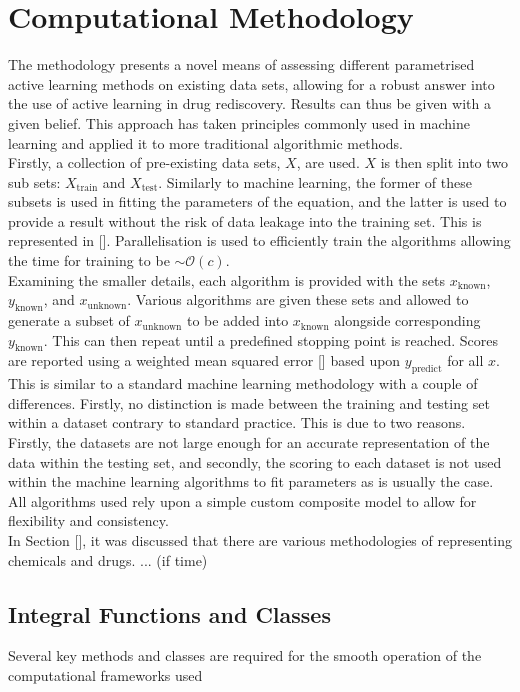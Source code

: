 \section{Computational Methodology}
The methodology presents a novel means of assessing different parametrised active learning methods on existing data sets, allowing for a robust answer into the use of active learning in drug rediscovery. Results can thus be given with a given belief. This approach has taken principles commonly used in machine learning and applied it to more traditional algorithmic methods.
\\
Firstly, a collection of pre-existing data sets, $X$, are used. $X$ is then split into two sub sets: $X_{\mathrm{train}}$ and $X_\mathrm{test}$. Similarly to machine learning, the former of these subsets is used in fitting the parameters of the equation, and the latter is used to provide a result without the risk of data leakage into the training set. This is represented in []. Parallelisation is used to efficiently train the algorithms allowing the time for training to be $\sim{}\mathcal{O}(c)$.
\\
Examining the smaller details, each algorithm is provided with the sets $x_\mathrm{known}$, $y_\mathrm{known}$, and $x_\mathrm{unknown}$. Various algorithms are given these sets and allowed to generate a subset of $x_\mathrm{unknown}$ to be added into $x_\mathrm{known}$ alongside corresponding $y_\mathrm{known}$. This can then repeat until a predefined stopping point is reached. Scores are reported using a weighted mean squared error [] based upon $y_\mathrm{predict}$ for all $x$. This is similar to a standard machine learning methodology with a couple of differences. Firstly, no distinction is made between the training and testing set within a dataset contrary to standard practice. This is due to two reasons. Firstly, the datasets are not large enough for an accurate representation of the data within the testing set, and secondly, the scoring to each dataset is not used within the machine learning algorithms to fit parameters as is usually the case. All algorithms used rely upon a simple custom composite model to allow for flexibility and consistency.
\\
In Section [], it was discussed that there are various methodologies of representing chemicals and drugs. ... (if time)

\subsection{Integral Functions and Classes}
Several key methods and classes are required for the smooth operation of the computational frameworks used

